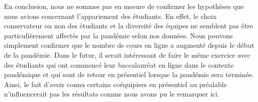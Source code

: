 \documentclass{article}
\begin{document}
En conclusion, nous ne sommes pas en mesure de confirmer les hypothèses que nous avions concernant l'appariement des étudiants. En effet, le choix conservateur ou non des étudiants et la diversité des équipes ne semblent pas être particulièrement affectés par la pandémie selon nos données. Nous pouvons simplement confirmer que le nombre de cours en ligne a augmenté depuis le début de la pandémie. Dans le futur, il serait intéressant de faire le même exercice avec des étudiants qui ont commencé leur baccalauréat en ligne dans le contexte pandémique et qui sont de retour en présentiel lorsque la pandémie sera terminée. Ainsi, le fait d'avoir connu certains coéquipiers en présentiel au préalable n'influencerait pas les résultats comme nous avons pu le remarquer ici.


\end{document}
